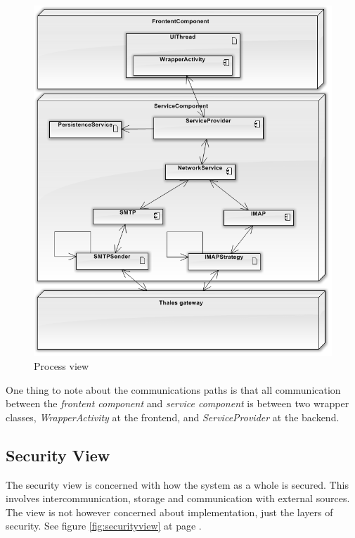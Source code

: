 \begin{figure}[H]
	\includegraphics[width=\textwidth]{processview.png}
	\caption{Process view}
	\label{fig:processview}
\end{figure}

One thing to note about the communications paths is that all communication between the \textit{frontent component} and \textit{service component} is between two wrapper classes, \textit{WrapperActivity} at the frontend, and \textit{ServiceProvider} at the backend. 

\subsection{Security View}
The security view is concerned with how the system as a whole is secured. This involves intercommunication, storage and communication with external sources. The view is not however concerned about implementation, just the layers of security.
See figure \ref{fig:securityview} at page \pageref{fig:securityview}.

